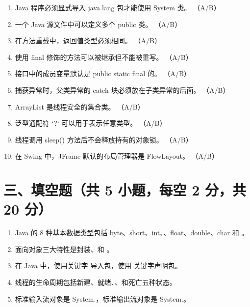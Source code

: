 \documentclass[a3paper, landscape, 11pt, twocolumn]{article}
\newcommand{\blank}{\underline{\hspace{2cm}}}
\begin{document}
\begin{enumerate}[label=\arabic*., itemsep=0.6em]
	\item Java 程序必须显式导入 java.lang 包才能使用 System 类。 \underline{\hspace{1cm}}（A/B）
	\item 一个 Java 源文件中可以定义多个 public 类。 \underline{\hspace{1cm}}（A/B）
	\item 在方法重载中，返回值类型必须相同。 \underline{\hspace{1cm}}（A/B）
	\item 使用 final 修饰的方法可以被继承但不能被重写。 \underline{\hspace{1cm}}（A/B）
	\item 接口中的成员变量默认是 public static final 的。 \underline{\hspace{1cm}}（A/B）
	\item 捕获异常时，父类异常的 catch 块必须放在子类异常的后面。 \underline{\hspace{1cm}}（A/B）
	\item ArrayList 是线程安全的集合类。 \underline{\hspace{1cm}}（A/B）
	\item 泛型通配符 `?` 可以用于表示任意类型。 \underline{\hspace{1cm}}（A/B）
	\item 线程调用 sleep() 方法后不会释放持有的对象锁。 \underline{\hspace{1cm}}（A/B）
	\item 在 Swing 中，JFrame 默认的布局管理器是 FlowLayout。 \underline{\hspace{1cm}}（A/B）
\end{enumerate}

\section*{三、填空题（共 5 小题，每空 2 分，共 20 分）}

\begin{enumerate}[label=\arabic*., itemsep=0.8em]
	\item Java 的 8 种基本数据类型包括 byte、short、int、\blank、float、double、char 和 \blank。
	\item 面向对象三大特性是封装、\blank 和 \blank。
	\item 在 Java 中，使用关键字 \blank 导入包，使用 \blank 关键字声明包。
	\item 线程的生命周期包括新建、就绪、\blank、\blank 和死亡五种状态。
	\item 标准输入流对象是 System.\blank，标准输出流对象是 System.\blank。
\end{enumerate}
\end{document}
